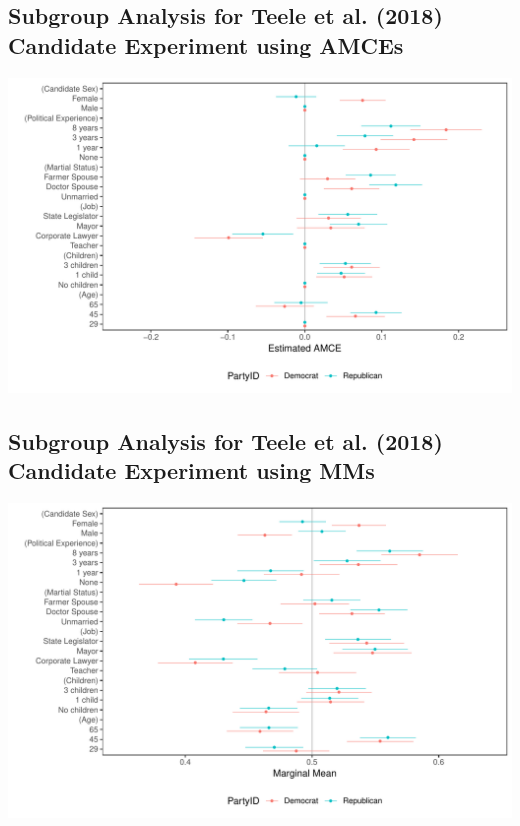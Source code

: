 \documentclass[a4paper,12pt]{article}\usepackage[]{graphicx}\usepackage[]{color}
\makeatletter
\def\maxwidth{ %
  \ifdim\Gin@nat@width>\linewidth
    \linewidth
  \else
    \Gin@nat@width
  \fi
}
\newenvironment{knitrout}{}{} %
\makeatother
\begin{document}
\clearpage

\subsection{Subgroup Analysis for Teele et al. (2018) Candidate Experiment using AMCEs}

\begin{knitrout}
\color{fgcolor}
\includegraphics[width=\maxwidth]{figure/tkr_subgroup_amce_appendix-1} 

\end{knitrout}

\subsection{Subgroup Analysis for Teele et al. (2018) Candidate Experiment using MMs}

\begin{knitrout}
\color{fgcolor}
\includegraphics[width=\maxwidth]{figure/tkr_subgroup_mm_appendix-1} 

\end{knitrout}
\end{document}
